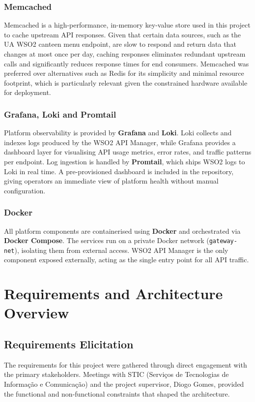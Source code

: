 \documentclass[12pt, a4paper]{report}
\begin{document}
\subsection{Memcached}
Memcached is a high-performance, in-memory key-value store used in this project to
cache upstream API responses. Given that certain data sources, such as the UA WSO2
canteen menu endpoint, are slow to respond and return data that changes at most
once per day, caching responses eliminates redundant upstream calls
and significantly reduces response times for end consumers. Memcached was preferred
over alternatives such as Redis for its simplicity and minimal resource footprint,
which is particularly relevant given the constrained hardware available for deployment.

\subsection{Grafana, Loki and Promtail}
Platform observability is provided by \textbf{Grafana} and \textbf{Loki}.
Loki collects and indexes logs produced by the WSO2 API Manager, while Grafana
provides a dashboard layer for visualising API usage metrics, error rates, and
traffic patterns per endpoint. Log ingestion is handled by \textbf{Promtail},
which ships WSO2 logs to Loki in real time. A pre-provisioned dashboard is
included in the repository, giving operators an immediate view of platform health
without manual configuration.

\subsection{Docker}
All platform components are containerised using \textbf{Docker} and orchestrated
via \textbf{Docker Compose}. The services run on a private Docker network
(\texttt{gateway-net}), isolating them from external access. WSO2 API Manager is
the only component exposed externally, acting as the single entry point for all
API traffic.

\chapter{Requirements and Architecture Overview}
\label{chap:requirements}

\section{Requirements Elicitation}
The requirements for this project were gathered through direct engagement with the
primary stakeholders. Meetings with STIC (Serviços de Tecnologias de Informação e
Comunicação) and the project supervisor, Diogo Gomes, provided the functional and
non-functional constraints that shaped the architecture.
\end{document}
